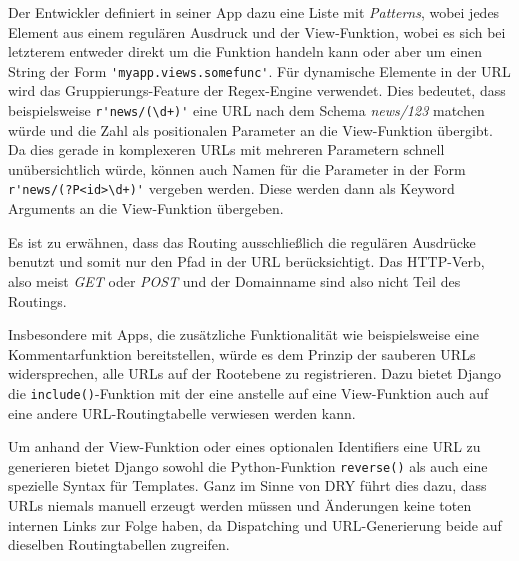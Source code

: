 \begin{description}
Der Entwickler definiert in seiner App dazu eine Liste mit \emph{Patterns}, wobei jedes Element aus
einem regulären Ausdruck und der View-Funktion, wobei es sich bei letzterem entweder direkt um die
Funktion handeln kann oder aber um einen String der Form \lstinline{'myapp.views.somefunc'}. Für
dynamische Elemente in der URL wird das Gruppierungs-Feature der Regex-Engine verwendet. Dies
bedeutet, dass beispielsweise \lstinline{r'news/(\d+)'} eine URL nach dem Schema \emph{news/123}
matchen würde und die Zahl als positionalen Parameter an die View-Funktion übergibt. Da dies gerade
in komplexeren URLs mit mehreren Parametern schnell unübersichtlich würde, können auch Namen für die
Parameter in der Form \lstinline{r'news/(?P<id>\d+)'} vergeben werden. Diese werden dann als Keyword
Arguments an die View-Funktion übergeben.

Es ist zu erwähnen, dass das Routing ausschließlich die regulären Ausdrücke benutzt und somit nur
den Pfad in der URL berücksichtigt. Das HTTP-Verb, also meist \emph{GET} oder \emph{POST} und der
Domainname sind also nicht Teil des Routings.

Insbesondere mit Apps, die zusätzliche Funktionalität wie beispielsweise eine Kommentarfunktion
bereitstellen, würde es dem Prinzip der sauberen URLs widersprechen, alle URLs auf der Rootebene zu
registrieren. Dazu bietet Django die \lstinline{include()}-Funktion mit der eine anstelle auf eine
View-Funktion auch auf eine andere URL-Routingtabelle verwiesen werden kann.

Um anhand der View-Funktion oder eines optionalen Identifiers eine URL zu generieren bietet Django
sowohl die Python-Funktion \lstinline{reverse()} als auch eine spezielle Syntax für Templates. Ganz
im Sinne von DRY führt dies dazu, dass URLs niemals manuell erzeugt werden müssen und Änderungen
keine toten internen Links zur Folge haben, da Dispatching und URL-Generierung beide auf dieselben
Routingtabellen zugreifen.

\end{description}
